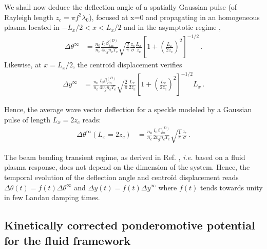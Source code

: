 \documentclass[%
 reprint,
 amsmath,amssymb,
 aps,
]{revtex4-1}
\begin{document}
We shall now deduce the deflection angle of a spatially Gaussian pulse (of Rayleigh length $z_c=\pi f^2\lambda_0$), focused at x=0 and propagating in an homogeneous plasma located in $-L_x/2<x<L_x/2$ and  in the asymptotic regime \cite[]{Ruyer_2020}, 
  \begin{align}
\Delta \theta^{\infty} & =\frac{n_0 }{n_c}  \frac{  I_0   \beta_\mathrm{kin}^{(D)}}{ 4 v_g n_c T_e } \sqrt{\frac{2}{\pi}}      \frac{z_c}{\sigma} \frac{L_x}{z_c} \left[ 1+\left(\frac{L_x}{2z_c}\right)^2\right]^{-1/2}
  \, .\label{eq:dth}
\end{align}
Likewise, at $x = L_x/2$, the centro\"id displacement  verifies
 \begin{align}
\Delta y^{\infty} & = \frac{n_0 }{n_c}  \frac{  I_0   \beta_\mathrm{kin}^{(D)}}{ 4 v_g n_c T_e } \sqrt{\frac{2}{\pi}}     \frac{L_x}{2z_c} \left[ 1+\left(\frac{L_x}{2z_c}\right)^2\right]^{-1/2} L_x
  \, .\label{eq:dy}
\end{align}

Hence, the average wave vector deflection for a speckle modeled by a Gaussian pulse of length $L_x=2z_c $ reads: 
 \begin{align}
\Delta \theta^{\infty}(L_x=2z_c) & = \frac{n_0 }{n_c}  \frac{  I_0   \beta_\mathrm{kin}^{(D)}}{ 2 v_g n_c T_e } \sqrt{\frac{1}{\pi}}      \frac{z_c}{\sigma}   
  \, .\label{eq:dthf}
\end{align}

The beam bending transient regime, as derived in 
 Ref. \cite[]{ Ruyer_2020}, \emph{i.e.} based on a fluid plasma response, does not depend on the dimension of the system. Hence, the temporal evolution of the deflection angle and centro\"id displacement reads $\Delta \theta(t)  =f(t)\Delta \theta^{\infty} $ and $\Delta y(t)  =f(t)\Delta y^{\infty} $ where $f(t)$ tends towards unity in few Landau damping times. 
 

\subsection{Kinetically  corrected ponderomotive potential for the fluid framework } \label{sec:transient}
\end{document}
